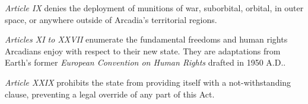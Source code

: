 \item {\it Article IX} denies the deployment of munitions of war, suborbital, orbital, in outer space, or anywhere outside of Arcadia's territorial regions.

\item {\it Articles XI to XXVII} enumerate the fundamental freedoms and human rights Arcadians enjoy with respect to their new state. They are adaptations from Earth's former {\it European Convention on Human Rights} drafted in 1950 A.D..

\item {\it Article XXIX} prohibits the state from providing itself with a not-withstanding clause, preventing a legal override of any part of this Act.
\stopitemize

